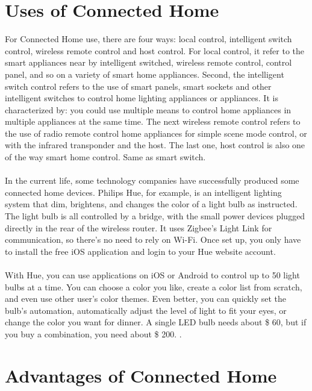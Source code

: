 \documentclass[report]{IEEEtran}
\begin{document}
\section{Uses of Connected Home}
For Connected Home use, there are four ways: local control, intelligent switch control, wireless remote control and host control. For local control, it refer to the smart appliances near by intelligent switched, wireless remote control, control panel, and so on a variety of smart home appliances. Second, the intelligent switch control refers to the use of smart panels, smart sockets and other intelligent switches to control home lighting appliances or appliances. It is characterized by: you could use multiple means to control home appliances in multiple appliances at the same time. The next wireless remote control refers to the use of radio remote control home appliances for simple scene mode control, or with the infrared transponder and the host. The last one, host control is also one of the way smart home control. Same as smart switch.
\\\\ In the current life, some technology companies have successfully produced some connected home devices. Philips Hue, for example, is an intelligent lighting system that dim, brightens, and changes the color of a light bulb as instructed. The light bulb is all controlled by a bridge, with the small power devices plugged directly in the rear of the wireless router. It uses Zigbee's Light Link for communication, so there's no need to rely on Wi-Fi. Once set up, you only have to install the free iOS application and login to your Hue website account.
\\\\ With Hue, you can use applications on iOS or Android to control up to 50 light bulbs at a time. You can choose a color you like, create a color list from scratch, and even use other user's color themes. Even better, you can quickly set the bulb's automation, automatically adjust the level of light to fit your eyes, or change the color you want for dinner. A single LED bulb needs about \$ 60, but if you buy a combination, you need about \$ 200. \cite{3}.



\section{Advantages of Connected Home}
\end{document}

